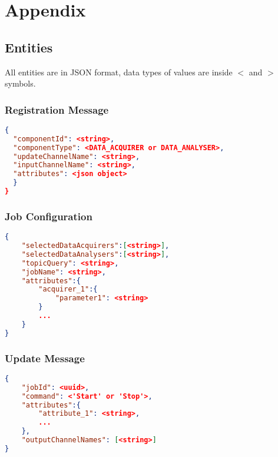 \appendix
\chapter{Appendix}


\section{Entities}\label{appendix}

All entities are in JSON format, data types of values are inside $<$ and $>$ symbols.

\subsection{Registration Message}\label{subsection:registrationrequest}

\begin{lstlisting}[language=json,firstnumber=1]
{
  "componentId": <string>,
  "componentType": <DATA_ACQUIRER or DATA_ANALYSER>,
  "updateChannelName": <string>,
  "inputChannelName": <string>,
  "attributes": <json object>
  }
}
\end{lstlisting}

\subsection{Job Configuration}

\begin{lstlisting}[language=json,firstnumber=1]
{
    "selectedDataAcquirers":[<string>],
    "selectedDataAnalysers":[<string>],
    "topicQuery": <string>,
    "jobName": <string>,
    "attributes":{
        "acquirer_1":{
            "parameter1": <string>
        }
        ...
    }
}
\end{lstlisting}

\subsection{Update Message}\label{subsection:notification}

\begin{lstlisting}[language=json,firstnumber=1]
{
    "jobId": <uuid>,
    "command": <'Start' or 'Stop'>,
    "attributes":{
        "attribute_1": <string>,
        ...
    },
    "outputChannelNames": [<string>]
}
\end{lstlisting}

